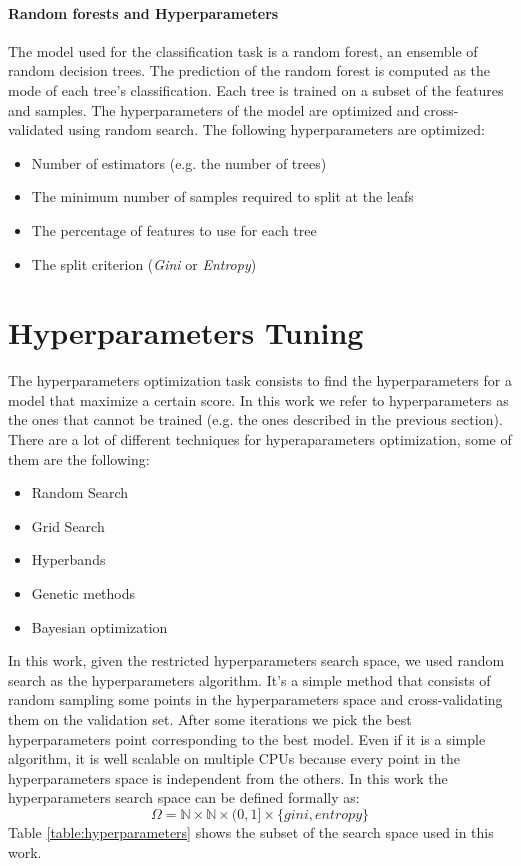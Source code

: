 \documentclass[11pt, a4paper]{article}
\begin{document}
\begin{multicols}{2}
  \paragraph{Random forests and Hyperparameters}
    The model used for the classification task is a random forest, an ensemble of random decision trees. The prediction of the random forest is computed as the mode of each tree's classification. Each tree is trained on a subset of the features and samples.
    The hyperparameters of the model are optimized and cross-validated using random search. The following hyperparameters are optimized:
    \begin{itemize}
      \item Number of estimators (e.g. the number of trees)
      \item The minimum number of samples required to split at the leafs
      \item The percentage of features to use for each tree
      \item The split criterion (\textit{Gini} or \textit{Entropy})
    \end{itemize}

\section{Hyperparameters Tuning}
  The hyperparameters optimization task consists to find the hyperparameters for a model that maximize a certain score. In this work we refer to hyperparameters as the ones that cannot be trained (e.g. the ones described in the previous section).
  There are a lot of different techniques for hyperaparameters optimization, some of them are the following:
  \begin{itemize}
    \item Random Search
    \item Grid Search
    \item Hyperbands
    \item Genetic methods
    \item Bayesian optimization
  \end{itemize}
  In this work, given the restricted hyperparameters search space, we used random search as the hyperparameters algorithm. It's a simple method that consists of random sampling some points in the hyperparameters space and cross-validating them on the validation set. After some iterations we pick the best hyperparameters point corresponding to the best model.
  Even if it is a simple algorithm, it is well scalable on multiple CPUs because every point in the hyperparameters space is independent from the others.
  In this work the hyperparameters search space can be defined formally as:
  \[\Omega=\mathbb{N}\times\mathbb{N}\times(0,1]\times\{gini, entropy\}\]
  Table \ref{table:hyperparameters} shows the subset of the search space used in this work.
  

\end{multicols}
\end{document}
